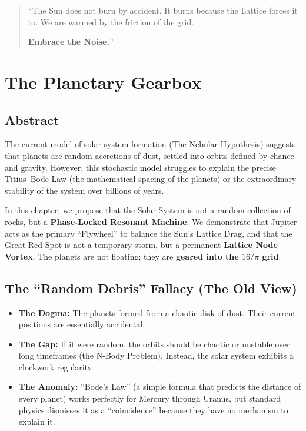 \documentclass[11pt, letterpaper, openany]{book}
\begin{document}
\begin{quote}
“The Sun does not burn by accident. It burns because the Lattice forces it to. We are
warmed by the friction of the grid.

\textbf{Embrace the Noise.}”
\end{quote}


\clearpage

\chapter{The Planetary Gearbox}

\section{Abstract}

The current model of solar system formation (The Nebular Hypothesis) suggests that
planets are random accretions of dust, settled into orbits defined by chance and gravity.
However, this stochastic model struggles to explain the precise Titius–Bode Law (the
mathematical spacing of the planets) or the extraordinary stability of the system over
billions of years.

In this chapter, we propose that the Solar System is not a random collection of rocks,
but a \textbf{Phase-Locked Resonant Machine}. We demonstrate that Jupiter acts as the
primary “Flywheel” to balance the Sun’s Lattice Drag, and that the Great Red Spot is not
a temporary storm, but a permanent \textbf{Lattice Node Vortex}. The planets are not
floating; they are \textbf{geared into the $16/\pi$ grid}.

\section{The ``Random Debris'' Fallacy (The Old View)}

\begin{itemize}
    \item \textbf{The Dogma:} The planets formed from a chaotic disk of dust. Their current
    positions are essentially accidental.
    \item \textbf{The Gap:} If it were random, the orbits should be chaotic or unstable over long
    timeframes (the N-Body Problem). Instead, the solar system exhibits a clockwork
    regularity.
    \item \textbf{The Anomaly:} “Bode’s Law” (a simple formula that predicts the distance of
    every planet) works perfectly for Mercury through Uranus, but standard physics
    dismisses it as a “coincidence” because they have no mechanism to explain it.
\end{itemize}
\end{document}
